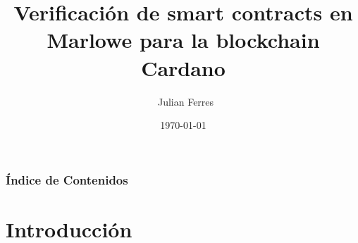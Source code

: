 \documentclass{beamer}
\title[Verificación de smart contracts en Marlowe]%
{Verificación de smart contracts en Marlowe para la blockchain Cardano}
\author[Julian Ferres] %
{~Julian Ferres}
\institute[FIUBA] %
{
  Facultad de Ingeniería\\Universidad de Buenos Aires.
}
\date{\today}
\begin{document}



\begin{frame}
	\titlepage
\end{frame}


\begin{frame} 
	\footnotesize
	\frametitle{Índice de Contenidos}
	\tableofcontents
\end{frame}

%
%
%
%
%
%
%
%

\section{Introducción}
\end{document}
